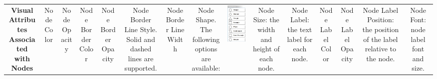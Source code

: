 \begin{tabular}{|c|c|c|c|c|c|c|c|c|c|c|c|c|c|c|}
\hline 
 & & & & & & & & & & & & & & \\
 \hline 


 \textbf{Visual Attributes Associated with Nodes}

 &

 Node Color 
 &

 Node Opacity 
 &

 Node Border Color 
 &

 Node Border Opacity 
 &

 Node Border Line Style. Solid and dashed lines are supported. 
 &

 Node Border Line Width 
 &

 Node Shape. The following options are available: 
 &

 \includegraphics[width=.6\textwidth]{images/NewVizMapperNodeShape.png} 
 &

 Node Size: the width and height of each node. 
 &

 Node Label: the text label for each node. 
 &

 Node Label Color 
 &

 Node Label Opacity 
 &

 Node Label Position: the position of the label relative to the node. 
 &

 Node Font: node label font and size. 
 \\
 \hline 

\end{tabular}


